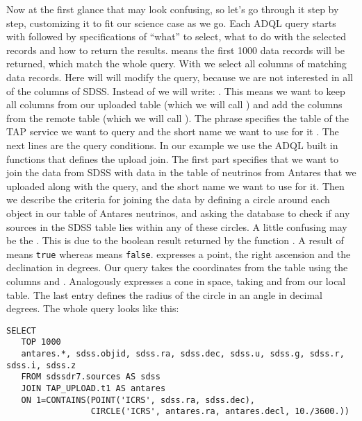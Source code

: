 \documentclass[twoside]{article}[12pt]
\begin{document}
Now at the first glance that may look confusing, so let's go through it
step by step, customizing it to fit our science case as we go.
Each ADQL query starts with  followed by
specifications of ``what'' to select, what to do with the selected records
and how to return the results. 
means the first 1000 data records will be returned, which match the
whole query. 
With \sql{*} we select all columns of matching data records. Here will
will modify the query, because we are not interested in all of the
columns of SDSS. Instead of \sql{*} we will write: 
. This
means we want to keep all columns from our uploaded table (which we will call
) and add the columns from the remote table (which we will call ). 
The phrase  specifies the table of the TAP service we
want to query  and the short name we want to use for it . 
The next lines are the query conditions. In our example we use the ADQL
built in functions that defines the upload join.
The first part  specifies that we want to join the data from SDSS with 
data in the table of neutrinos from Antares that we uploaded along with the query,
and the short name we want to use for it.
Then we describe the criteria for joining the data by defining a
circle around each object in our table of Antares neutrinos, and asking the database to
check if any sources in the SDSS table lies within any of these
circles. 
A little confusing may be the . This is due to the boolean
result returned by the function . A result of 
means \verb|true| whereas  means \verb|false|. 
 expresses a point, the right ascension and the declination
in degrees. Our query takes the coordinates from the table using the columns
 and . 
Analogously  expresses a cone in space, taking  and
 from our local table. The last entry defines the radius of
the circle in an angle in decimal degrees. The whole query looks like
this: 

\lstset{style=daiquiri, language=SQL}
\begin{lstlisting}
SELECT
   TOP 1000
   antares.*, sdss.objid, sdss.ra, sdss.dec, sdss.u, sdss.g, sdss.r, sdss.i, sdss.z
   FROM sdssdr7.sources AS sdss
   JOIN TAP_UPLOAD.t1 AS antares
   ON 1=CONTAINS(POINT('ICRS', sdss.ra, sdss.dec),
                 CIRCLE('ICRS', antares.ra, antares.decl, 10./3600.))
\end{lstlisting}
\end{document}
